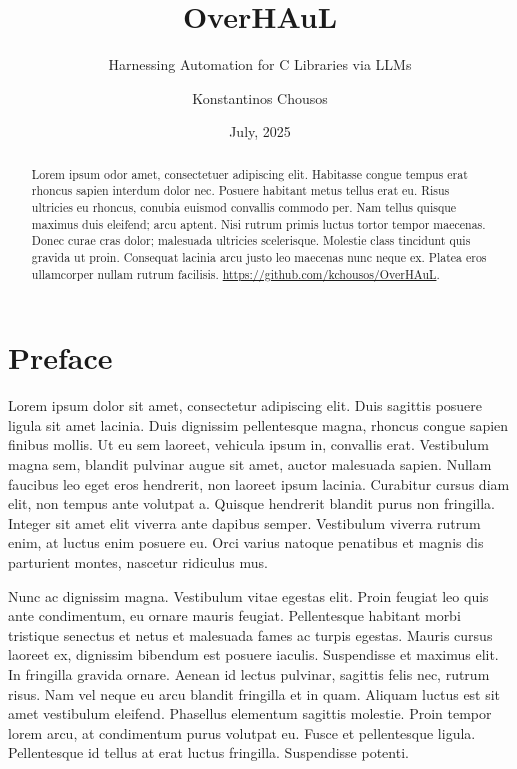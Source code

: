 \documentclass[
  a4paper,
  DIV=11,
  numbers=noendperiod]{scrreprt}
\title{OverHAuL}
\subtitle{Harnessing Automation for C Libraries via LLMs}
\author{Konstantinos Chousos}
\date{July, 2025}
\theoremstyle{definition}
\theoremstyle{remark}
\begin{document}
\maketitle
\begin{abstract}
Lorem ipsum odor amet, consectetuer adipiscing elit. Habitasse congue
tempus erat rhoncus sapien interdum dolor nec. Posuere habitant metus
tellus erat eu. Risus ultricies eu rhoncus, conubia euismod convallis
commodo per. Nam tellus quisque maximus duis eleifend; arcu aptent. Nisi
rutrum primis luctus tortor tempor maecenas. Donec curae cras dolor;
malesuada ultricies scelerisque. Molestie class tincidunt quis gravida
ut proin. Consequat lacinia arcu justo leo maecenas nunc neque ex.
Platea eros ullamcorper nullam rutrum facilisis.
\url{https://github.com/kchousos/OverHAuL}.
\end{abstract}





\chapter*{Preface}\label{preface}


Lorem ipsum dolor sit amet, consectetur adipiscing elit. Duis sagittis
posuere ligula sit amet lacinia. Duis dignissim pellentesque magna,
rhoncus congue sapien finibus mollis. Ut eu sem laoreet, vehicula ipsum
in, convallis erat. Vestibulum magna sem, blandit pulvinar augue sit
amet, auctor malesuada sapien. Nullam faucibus leo eget eros hendrerit,
non laoreet ipsum lacinia. Curabitur cursus diam elit, non tempus ante
volutpat a. Quisque hendrerit blandit purus non fringilla. Integer sit
amet elit viverra ante dapibus semper. Vestibulum viverra rutrum enim,
at luctus enim posuere eu. Orci varius natoque penatibus et magnis dis
parturient montes, nascetur ridiculus mus.

Nunc ac dignissim magna. Vestibulum vitae egestas elit. Proin feugiat
leo quis ante condimentum, eu ornare mauris feugiat. Pellentesque
habitant morbi tristique senectus et netus et malesuada fames ac turpis
egestas. Mauris cursus laoreet ex, dignissim bibendum est posuere
iaculis. Suspendisse et maximus elit. In fringilla gravida ornare.
Aenean id lectus pulvinar, sagittis felis nec, rutrum risus. Nam vel
neque eu arcu blandit fringilla et in quam. Aliquam luctus est sit amet
vestibulum eleifend. Phasellus elementum sagittis molestie. Proin tempor
lorem arcu, at condimentum purus volutpat eu. Fusce et pellentesque
ligula. Pellentesque id tellus at erat luctus fringilla. Suspendisse
potenti.
\end{document}
